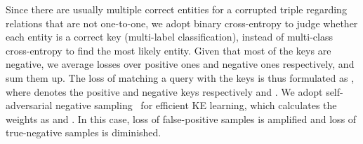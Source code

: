 \documentclass{article}
\newcommand{\wxt}[1]{{#1}}
\begin{document}
Since there are usually multiple correct entities for a corrupted triple regarding relations that are not one-to-one, 
we adopt binary cross-entropy to judge whether each entity is a correct key (multi-label classification), instead of multi-class cross-entropy to find the most likely entity. 
Given that most of the keys are negative, we \wxt{average} losses over positive ones and negative ones respectively, and sum them up. 
\wxt{
The loss of matching a query  with the keys  is thus formulated as 
, where  denotes the positive and negative keys respectively and . 
We adopt self-adversarial negative sampling~\cite{sun2019rotate} for efficient KE learning, which calculates the weights as  and . In this case,  loss of false-positive samples is amplified and loss of true-negative samples is diminished.
}

\begin{table*}[htbp]
    \small
    \centering
{}
\end{table*}
\end{document}
